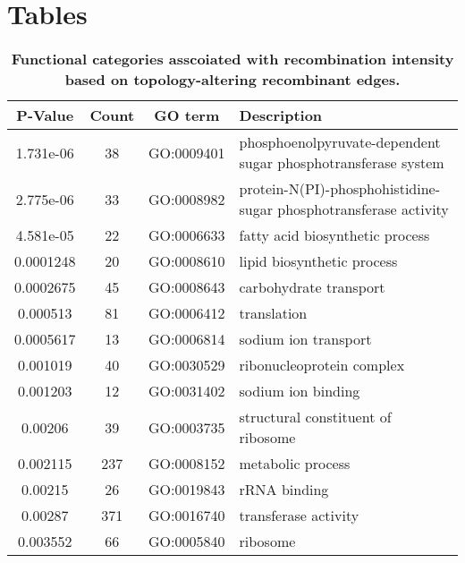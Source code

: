 \documentclass[10pt]{article}
\providecommand{\tabularnewline}{\\}
\begin{document}

\section*{Tables}

\begin{table}[!ht]
\caption{
\bf{Functional categories asscoiated with 
recombination intensity based on topology-altering recombinant edges.}}
\noindent \begin{centering}
\begin{tabular}{cccl}
\hline 
P-Value & Count & GO term & Description\tabularnewline
\hline 
1.731e-06 & 38 & GO:0009401 & phosphoenolpyruvate-dependent sugar phosphotransferase system\tabularnewline
2.775e-06 & 33 & GO:0008982 & protein-N(PI)-phosphohistidine-sugar phosphotransferase activity\tabularnewline
4.581e-05 & 22 & GO:0006633 & fatty acid biosynthetic process\tabularnewline
0.0001248 & 20 & GO:0008610 & lipid biosynthetic process\tabularnewline
0.0002675 & 45 & GO:0008643 & carbohydrate transport\tabularnewline
0.000513 & 81 & GO:0006412 & translation\tabularnewline
0.0005617 & 13 & GO:0006814 & sodium ion transport\tabularnewline
0.001019 & 40 & GO:0030529 & ribonucleoprotein complex\tabularnewline
0.001203 & 12 & GO:0031402 & sodium ion binding\tabularnewline
0.00206 & 39 & GO:0003735 & structural constituent of ribosome\tabularnewline
0.002115 & 237 & GO:0008152 & metabolic process\tabularnewline
0.00215 & 26 & GO:0019843 & rRNA binding\tabularnewline
0.00287 & 371 & GO:0016740 & transferase activity\tabularnewline
0.003552 & 66 & GO:0005840 & ribosome\tabularnewline
\hline 
\end{tabular}
\par\end{centering}
\label{tab:functional}
\end{table}
\end{document}
